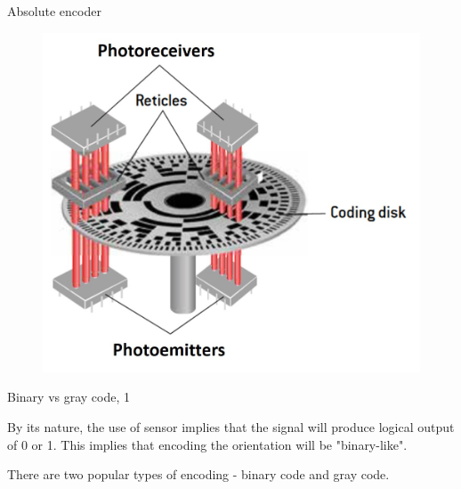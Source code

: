 \documentclass{beamer}
\begin{document}
\begin{frame}{Absolute encoder}
	\begin{flushleft}
		
		\begin{figure}
			\centering
			\includegraphics[width=0.7\linewidth]{Absolute-encoder}
			\label{fig:absolute-encoder}
		\end{figure}
		
		
	\end{flushleft}
\end{frame}



\begin{frame}{Binary vs gray code, 1}
	\begin{flushleft}
		
		By its nature, the use of sensor implies that the signal will produce logical output of 0 or 1. This implies that encoding the orientation will be "binary-like".  
		
		\bigskip
		
		There are two popular types of encoding - binary code and gray code. 
		
	\end{flushleft}
\end{frame}
\end{document}
